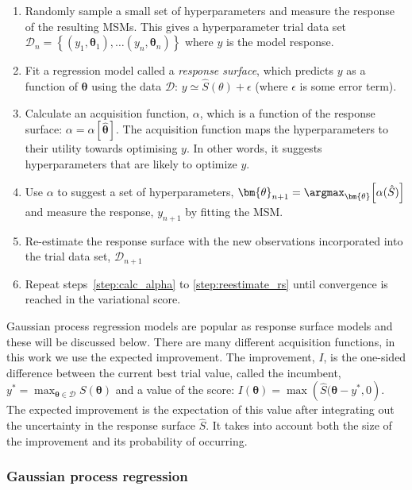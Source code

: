 \begin{enumerate}
    \item Randomly sample a small set of hyperparameters and measure the response of the resulting MSMs. This gives a hyperparameter trial data set $\mathcal{D}_{n}=\left\{(y_1, \bm{\theta}_1),  \ldots (y_n, \bm{\theta}_n) \right \}$ where $y$ is the model response.
    \item Fit a regression model called a \emph{response surface}, which predicts $y$ as a function of $\bm{\theta}$ using the data $\mathcal{D}$: $y \simeq \hat{S}(\theta) + \epsilon$ (where $\epsilon$ is some error term). 
    \item \label{step:calc_alpha} Calculate an acquisition function, $\alpha$, which is a function of the response surface: $\alpha=\alpha\left[\hat{\bm{\theta}}\right]$. The acquisition function maps the hyperparameters to their utility towards optimising $y$. In other words, it suggests hyperparameters that are likely to optimize $y$. 
    \item Use $\alpha$ to suggest a set of hyperparameters, $\bm{\theta}_{n+1} = \argmax_{\bm{\theta}}{\left[\alpha(\hat{S})\right]}$ and measure the response, $y_{n+1}$ by fitting the MSM.  
    \item \label{step:reestimate_rs} Re-estimate the response surface with the new observations incorporated into the trial data set, $\mathcal{D}_{n+1}$
    \item Repeat steps~\ref{step:calc_alpha} to \ref{step:reestimate_rs} until convergence is reached in the variational score. 
\end{enumerate}

Gaussian process regression models  are popular as response surface models and these will be discussed below. There are many different acquisition functions, in this work we use the expected improvement.  The improvement, $I$, is the one-sided difference between the current best trial value, called the incumbent, $y^{*} = \max_{\bm{\theta}\in \mathcal{D}}{S(\bm{\theta})}$ and a value of the score: $I(\bm{\theta}) = \max{\left(\hat{S}(\bm{\theta}   -y^{*}, 0\right)}$. The expected improvement is the expectation of this value after integrating out the uncertainty in the response surface $\hat{S}$. It takes into account both the size of the improvement and its probability of occurring. 

\subsubsection{Gaussian process regression}

